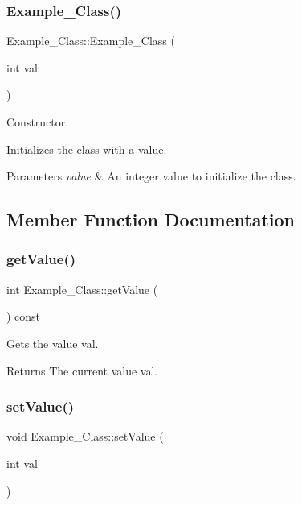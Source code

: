 \subsubsection{\texorpdfstring{Example\+\_\+\+Class()}{Example\_Class()}}
{\footnotesize\ttfamily Example\+\_\+\+Class\+::\+Example\+\_\+\+Class (\begin{DoxyParamCaption}\item[{int}]{val }\end{DoxyParamCaption})}



Constructor. 

Initializes the class with a value. 
\begin{DoxyParams}{Parameters}
{\em value} & An integer value to initialize the class. \\
\hline
\end{DoxyParams}


\subsection{Member Function Documentation}
\mbox{\label{classExample__Class_a029eda159ecb5e6f2fbb39c549305019}} 
\subsubsection{\texorpdfstring{get\+Value()}{getValue()}}
{\footnotesize\ttfamily int Example\+\_\+\+Class\+::get\+Value (\begin{DoxyParamCaption}{ }\end{DoxyParamCaption}) const}



Gets the value val. 

\begin{DoxyReturn}{Returns}
The current value val. 
\end{DoxyReturn}
\mbox{\label{classExample__Class_a78b4cb3bc740ebbae7a263711efce0df}} 
\subsubsection{\texorpdfstring{set\+Value()}{setValue()}}
{\footnotesize\ttfamily void Example\+\_\+\+Class\+::set\+Value (\begin{DoxyParamCaption}\item[{int}]{val }\end{DoxyParamCaption})}



